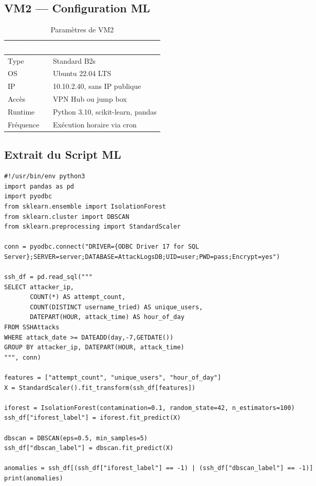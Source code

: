 \documentclass[11pt,a4paper]{report}
\newcommand{\theadcell}[1]{\cellcolor{tabheader}\textcolor{white}{\bfseries #1}}
\begin{document}
\subsection{VM2 --- Configuration ML}
\begin{table}[H]
\centering
\caption{Paramètres de VM2}
\label{tab:vm2}
\small
\begin{tabularx}{\textwidth}{|L{4cm}|Y|}
\hline
\theadcell{Paramètre} & \theadcell{Valeur} \\
\hline
Type & Standard B2s \\ \hline
OS & Ubuntu 22.04 LTS \\ \hline
IP & 10.10.2.40, sans IP publique \\ \hline
Accès & VPN Hub ou jump box \\ \hline
Runtime & Python 3.10, scikit-learn, pandas \\ \hline
Fréquence & Exécution horaire via cron \\ \hline
\end{tabularx}
\end{table}

\subsection{Extrait du Script ML}
\begin{lstlisting}[style=pythonstyle, caption={Script ML Isolation Forest et DBSCAN}]
#!/usr/bin/env python3
import pandas as pd
import pyodbc
from sklearn.ensemble import IsolationForest
from sklearn.cluster import DBSCAN
from sklearn.preprocessing import StandardScaler

conn = pyodbc.connect("DRIVER={ODBC Driver 17 for SQL Server};SERVER=server;DATABASE=AttackLogsDB;UID=user;PWD=pass;Encrypt=yes")

ssh_df = pd.read_sql("""
SELECT attacker_ip,
       COUNT(*) AS attempt_count,
       COUNT(DISTINCT username_tried) AS unique_users,
       DATEPART(HOUR, attack_time) AS hour_of_day
FROM SSHAttacks
WHERE attack_date >= DATEADD(day,-7,GETDATE())
GROUP BY attacker_ip, DATEPART(HOUR, attack_time)
""", conn)

features = ["attempt_count", "unique_users", "hour_of_day"]
X = StandardScaler().fit_transform(ssh_df[features])

iforest = IsolationForest(contamination=0.1, random_state=42, n_estimators=100)
ssh_df["iforest_label"] = iforest.fit_predict(X)

dbscan = DBSCAN(eps=0.5, min_samples=5)
ssh_df["dbscan_label"] = dbscan.fit_predict(X)

anomalies = ssh_df[(ssh_df["iforest_label"] == -1) | (ssh_df["dbscan_label"] == -1)]
print(anomalies)
\end{lstlisting}
\end{document}
